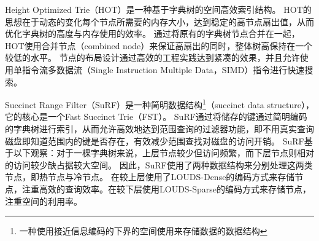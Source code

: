 Height Optimized Trie\cite{binna2018hot}（HOT）是一种基于字典树的空间高效索引结构。
HOT的思想在于动态的变化每个节点所需要的内存大小，达到稳定的高节点扇出值，从而优化字典树的高度与内存使用的效率。
通过将原有的字典树节点合并在一起，HOT使用合并节点（combined node）来保证高扇出的同时，整体树高保持在一个较低的水平。
节点的布局设计通过高效的工程实践达到紧凑的效果，并且允许使用单指令流多数据流（Single Instruction Multiple Data，SIMD）指令进行快速搜索。


Succinct Range Filter\cite{zhang2018surf}（SuRF）是一种简明数据结构\footnote{一种使用接近信息编码的下界的空间使用来存储数据的数据结构}（succinct data structure），它的核心是一个Fast Succinct Trie（FST）。
SuRF通过将储存的键通过简明编码的字典树进行索引，从而允许高效地达到范围查询的过滤器功能，即不用真实查询磁盘即知道范围内的键是否存在，有效减少范围查找对磁盘的访问开销。
SuRF基于以下观察：对于一棵字典树来说，上层节点较少但访问频繁，而下层节点则相对的访问较少缺占据较大空间。
因此，SuRF使用了两种数据结构来分别处理这两类节点，即热节点与冷节点。
在较上层使用了LOUDS-Dense的编码方式来存储节点，注重高效的查询效率。在较下层使用LOUDS-Sparse的编码方式来存储节点，注重空间的利用率。


